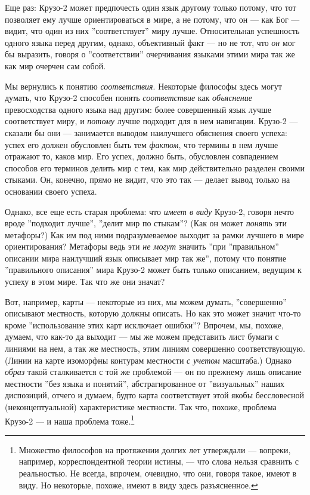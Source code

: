 \documentclass[11pt]{book}
\begin{document}
Еще раз: Крузо-2 может предпочесть один язык другому только потому, что тот позволяет ему лучше ориентироваться в мире, а не потому, что он --- как Бог --- видит, что один из них ''соответствует'' миру лучше. Относительная успешность одного языка перед другим, однако, объективный факт --- но не тот, что \textit{он} мог бы выразить, говоря о ''соответствии'' очерчивания языками этими мира так же как мир очерчен сам собой.

Мы вернулись к понятию \textit{соответствия}. Некоторые философы здесь могут думать, что Крузо-2 способен понять \textit{соответствие} как \textit{объяснение} превосходства одного языка над другим: более совершенный язык лучше соответствует миру, и \textit{потому} лучше подходит для в нем навигации. Крузо-2 --- сказали бы они --- занимается выводом наилучшего обяснения своего успеха: успех его должен обусловлен быть тем \textit{фактом}, что термины в нем лучше отражают то, каков мир. Его успех, должно быть, обусловлен совпадением способов его терминов делить мир с тем, как мир действительно разделен своими стыками. Он, конечно, прямо не видит, что это так --- делает вывод только на основании своего успеха.

Однако, все еще есть старая проблема: что \textit{имеет в виду} Крузо-2, говоря нечто вроде ''подходит лучше'', ''делит мир по стыкам''? (Как он может \textit{понять} эти метафоры?) Как им под ними подразумеваемое выходит за рамки лучшего в мире ориентирования? Метафоры ведь эти \textit{не могут} значить ''при ''правильном'' описании мира наилучший язык описывает мир так же'', потому что понятие ''правильного описания'' мира Крузо-2 может быть только описанием, ведущим к успеху в этом мире. Так что же они значат?

Вот, например, карты --- некоторые из них, мы можем думать, ''совершенно'' описывают местность, которую должны описать. Но как это может значит что-то кроме ''использование этих карт исключает ошибки''? Впрочем, мы, похоже, думаем, что как-то да выходит --- мы же можем представить лист бумаги с линиями на нем, а так же местность, этим линиям совершенно соответствующую. (Линии на карте изоморфны контурам местности \textit{с учетом} масштаба.) Однако \textit{образ} такой сталкивается с той же проблемой --- он по прежнему лишь описание местности ''без языка и понятий'', абстрагированное от ''визуальных'' наших диспозиций, отчего и думаем, будто карта соответствует этой якобы бессловесной (неконцептуальной) характеристике местности. Так что, похоже, проблема Крузо-2 --- и наша проблема тоже.\footnote{Множество философов на протяжении долгих лет утверждали --- вопреки, например, корреспондентной теории истины, --- что слова нельзя сравнить с реальностью. Не всегда, впрочем, очевидно, что они, говоря такое, имеют в виду. Но некоторые, похоже, имеют в виду здесь разъясненное.}
\end{document}
